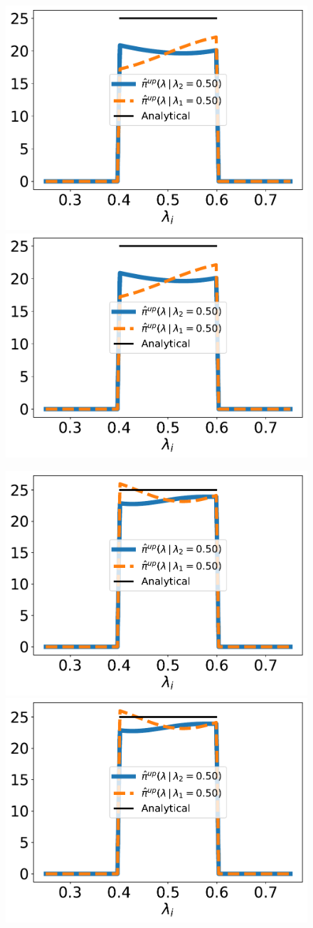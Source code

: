 \begin{figure}[ht]
\centering
\begin{minipage}{.975\textwidth}
		\includegraphics[width=0.5\linewidth]{./examples/identity/samp/identity_1d_conditionals_50E-2_N100_approx.pdf}
    \includegraphics[width=0.5\linewidth]{./examples/identity/samp/identity_1d_conditionals_50E-2_N100_approx.pdf}
\end{minipage}
\begin{minipage}{.975\textwidth}
		\includegraphics[width=0.5\linewidth]{./examples/identity/samp/identity_1d_conditionals_50E-2_N1000_approx.pdf}
		\includegraphics[width=0.5\linewidth]{./examples/identity/samp/identity_1d_conditionals_50E-2_N1000_approx.pdf}

\end{minipage}
\end{figure}
